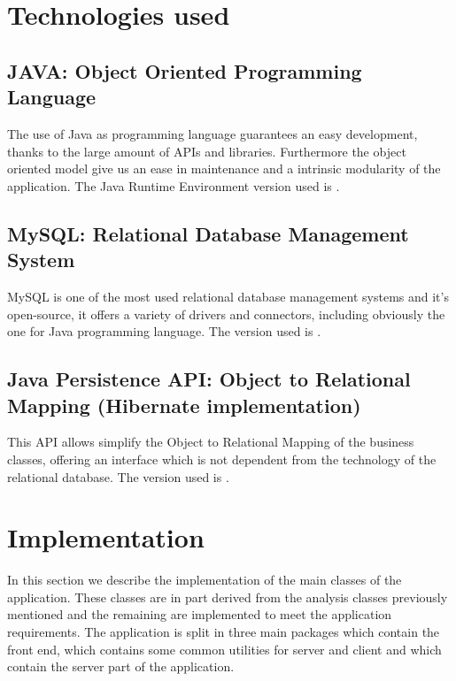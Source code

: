 \section{Technologies used}

\subsection{JAVA: Object Oriented Programming Language}

The use of Java as programming language guarantees an easy development, thanks
to the large amount of APIs and libraries. Furthermore the object oriented model
give us an ease in maintenance and a intrinsic modularity of the application.
The Java Runtime Environment version used is .

\subsection{MySQL: Relational Database Management System}

MySQL is one of the most used relational database management systems and it's
open-source, it offers a variety of drivers and connectors, including obviously
the one for Java programming language. The version used is .

\subsection{Java Persistence API: Object to Relational Mapping (Hibernate
implementation)}

This API allows simplify the Object to Relational Mapping of the business
classes, offering an interface which is not dependent from the technology of the
relational database. The version used is .

\section{Implementation}

In this section we describe the implementation of the main classes of the
application. These classes are in part derived from the analysis classes
previously mentioned and the remaining are implemented to meet the application
requirements. The application is split in three main packages
 which contain the front end,  which
contains some common utilities for server and client and
 which contain the server part of the application.
